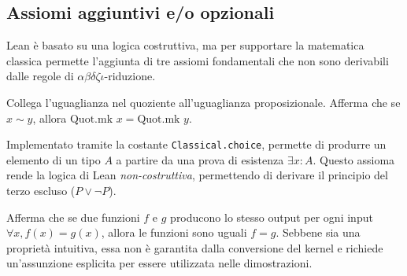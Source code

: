 \subsection{Assiomi aggiuntivi e/o opzionali}
Lean è basato su una logica costruttiva, ma per supportare la matematica classica permette l'aggiunta di tre assiomi fondamentali che non sono 
derivabili dalle regole di $\alpha\beta\delta\zeta\iota$-riduzione.
\begin{description}[leftmargin=1.5em, style=nextline, font=\bfseries]
    \item [Quot.sound]
        Collega l'uguaglianza nel quoziente all'uguaglianza proposizionale. Afferma che se $x \sim y$, allora $\text{Quot.mk } x = \text{Quot.mk } y$.
    \item [Assioma di scelta (Choice)]
        Implementato tramite la costante \texttt{Classical.choice}, permette di produrre un elemento di un tipo $A$ a partire da una prova di 
        esistenza $\exists x : A$. Questo assioma rende la logica di Lean \textit{non-costruttiva}, permettendo di derivare il principio del 
        terzo escluso ($P \vee \neg P$).
    \item [Estensionalità funzionale (FunExt)]
        Afferma che se due funzioni $f$ e $g$ producono lo stesso output per ogni input $\forall x, f(x) = g(x)$, allora le funzioni sono uguali $f = g$. 
        Sebbene sia una proprietà intuitiva, essa non è garantita dalla conversione del kernel e richiede un'assunzione esplicita per essere utilizzata nelle 
        dimostrazioni.
\end{description}